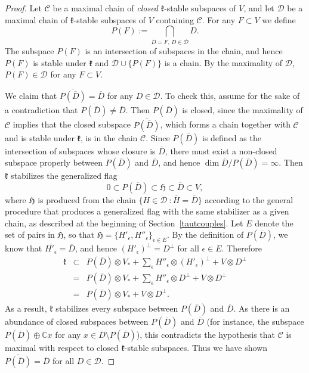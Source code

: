 \documentclass{article}
\newcommand {\C} {\mathbb{C}}
\def\k{\mathfrak{k}}
\def\H{\mathfrak{H}}
\def\Ch{\mathcal{C}}
\def\Dh{\mathcal{D}}
\begin{document}
\begin{proof}
Let $\Ch$ be a maximal chain of \emph{closed} $\k$-stable subspaces of $V$, and let $\Dh$ be a maximal chain of $\k$-stable subspaces of $V$ containing $\Ch$. For any $F \subset V$ we define $$P(F) := \bigcap_{\overline{D} = F, \, D \in \Dh} D.$$
The subspace $P(F)$ is an intersection of subspaces in the chain, and hence $P(F)$ is stable under $\k$ and $\Dh \cup \{ P(F) \}$ is a chain.  By the maximality of $\Dh$, $P(F) \in \Dh$ for any $F \subset V$. 
 
We claim that $\overline{P(\overline{D})} = \overline{D}$ for any $D \in \Dh$.  To check this, assume for the sake of a contradiction that $\overline{P(\overline{D})} \neq \overline{D}$.  Then $P(\overline{D})$ is closed, since the maximality of $\Ch$ implies that the closed subspace $\overline{P(\overline{D})}$, which forms a chain together with $\Ch$ and is stable under $\k$, is in the chain $\Ch$.  
Since $P(\overline{D})$ is defined as the intersection of subspaces whose closure is $\overline{D}$, there must exist a non-closed subspace properly between $P(\overline{D})$ and $\overline{D}$, and hence $\dim \overline{D} / P(\overline{D}) = \infty$.
Then $\k$ stabilizes the generalized flag
$$ 0 \subset P(\overline{D}) \subset \H \subset \overline{D} \subset V,$$
where $\H$ is produced from the chain  $\{ H \in \Dh ~\colon \overline{H} = \overline{D} \}$ according to the general procedure that produces a generalized flag with the same stabilizer as a given chain, as described at the beginning of Section~\ref{tautcouples}.  Let $E$ denote the set of pairs in $\H$, so that $\H = \{H'_\epsilon , H''_\epsilon \}_{\epsilon \in E}$.  By the definition of $P(\overline{D})$, we know that $\overline{H'_\epsilon} = \overline{D}$, and hence $(H'_\epsilon)^\perp = D^\perp$ for all $\epsilon \in E$.
Therefore
\begin{eqnarray*}
\k & \subset & P(\overline{D}) \otimes V_* + \sum_\epsilon H''_\epsilon \otimes (H'_\epsilon)^\perp +  V \otimes D^\perp \\
& = & P(\overline{D}) \otimes V_* + \sum_\epsilon H''_\epsilon \otimes D^\perp +  V \otimes D^\perp \\
& = & P(\overline{D}) \otimes V_* +  V \otimes D^\perp.
\end{eqnarray*}
As a result, $\k$ stabilizes every subspace between $P(\overline{D})$ and $\overline{D}$.  As there is an abundance of closed subspaces between $P(\overline{D})$ and $\overline{D}$ (for instance, the subspace $P(\overline{D}) \oplus \C x$ for any $x \in \overline{D} \setminus P(\overline{D})$), this contradicts the hypothesis that $\Ch$ is maximal with respect to closed $\k$-stable subspaces.  Thus we have shown $\overline{P(\overline{D})} = \overline{D}$ for all $D \in \Dh$.


\end{proof}
\end{document}
